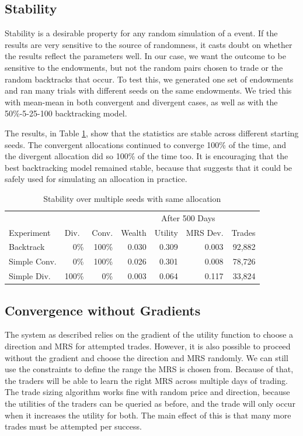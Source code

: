 \documentclass[12pt,a4paper,titlepage]{article}
\begin{document}
\subsection{Stability}
Stability is a desirable property for any random simulation of a event.
If the results are very sensitive to the source of randomness, it casts doubt on whether the results reflect the parameters well.
In our case, we want the outcome to be sensitive to the endowments, but not the random pairs chosen to trade or the random backtracks that occur. 
To test this, we generated one set of endowments and ran many trials with different seeds on the same endowments.
We tried this with mean-mean in both convergent and divergent cases, as well as with the 50\%-5-25-100 backtracking model.


The results, in Table \ref{tab:stable}, show that the statistics are stable across different starting seeds.
The convergent allocations continued to converge 100\% of the time, and the divergent allocation did so 100\% of the time too.
It is encouraging that the best backtracking model remained stable, because that suggests that it could be safely used for simulating an allocation in practice.

\begin{table}[h]
  \begin{tabular}{l|rr|rrrr}
    & \multicolumn{1}{l}{} & \multicolumn{1}{l}{} & \multicolumn{ 4}{|c}{After 500 Days} \\ 
    Experiment & \multicolumn{1}{l}{Div.} & \multicolumn{1}{l|}{Conv.} & \multicolumn{1}{l}{Wealth} & \multicolumn{1}{l}{Utility} & \multicolumn{1}{l}{MRS Dev.} & \multicolumn{1}{l}{Trades} \\ 
    \hline
    Backtrack & 0\% & 100\% & 0.030 & 0.309 & 0.003 & 92,882 \\ 
    Simple Conv. & 0\% & 100\% & 0.026 & 0.301 & 0.008 & 78,726 \\ 
    Simple Div. & 100\% & 0\% & 0.003 & 0.064 & 0.117 & 33,824 \\ 
  \end{tabular}
  \caption{Stability over multiple seeds with same allocation}
  \label{tab:stable}
\end{table}



\subsection{Convergence without Gradients}\label{nograd}
The system as described relies on the gradient of the utility function to choose a direction and MRS for attempted trades.
However, it is also possible to proceed without the gradient and choose the direction and MRS randomly.
We can still use the constraints to define the range the MRS is chosen from.
Because of that, the traders will be able to learn the right MRS across multiple days of trading.
The trade sizing algorithm works fine with random price and direction, because the utilities of the traders can be queried as before, and the trade will only occur when it increases the utility for both.
The main effect of this is that many more trades must be attempted per success.
\end{document}
